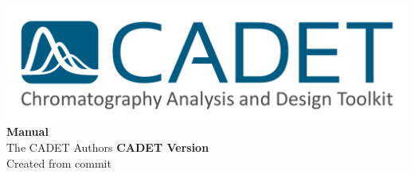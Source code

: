 \documentclass[%
a4paper, %
DIV=14,
BCOR=8mm,
10pt,
titlepage,
twoside,
toc=bibliography,
toc=index,
toc=listof,
toc=graduated,
]{scrreprt}
\begin{document}
%
\begin{titlepage}%
	\setcounter{page}{-100}%
	\begin{center}
		\includegraphics[width=0.6\linewidth]{../logo/CADET-Logo} \\
		\vspace{8cm}
		{\Huge\textbf{Manual}}\\
		\vspace{3cm}
		The CADET Authors
		\vspace{5cm}
		\textbf{CADET Version }\\
		\vspace{0.8cm}
		{\footnotesize Created from commit }
	\end{center}
\end{titlepage}

\newpage
\cleardoublepage

\tableofcontents

\newpage
\listoffigures

\newpage
\listoftables

\newpage
{}

%




\printbibliography

\printindex
\end{document}
